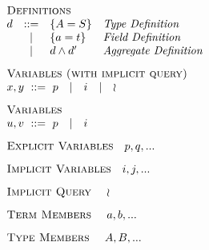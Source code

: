 \begin{minipage}[t]{.4\textwidth}\[\begin{array}{r c l l}
    \multicolumn{4}{l}{\textsc{Definitions}}                  \\
    d & ::= & \DEF{A}{S}      & \textit{Type Definition     } \\
      &  |  & \DEF{a}{t}      & \textit{Field Definition    } \\
      &  |  & \AGG{d}{d'}     & \textit{Aggregate Definition} \\[3mm]
    \multicolumn{4}{l}{\textsc{Variables (with implicit query)}} \\
    \multicolumn{4}{l}{x, y\ ::=\ p \quad | \quad i \quad | \quad \IMP} \\[3mm]
    \multicolumn{4}{l}{\textsc{Variables}} \\
    \multicolumn{4}{l}{u, v\ ::=\  p \quad | \quad i} \\[3mm]
    \multicolumn{4}{l}{\textsc{Explicit Variables} \quad p, q, ...} \\[3mm]
    \multicolumn{4}{l}{\textsc{Implicit Variables} \quad i, j, ...} \\[3mm]
    \multicolumn{4}{l}{\textsc{Implicit Query    } \quad \IMP     } \\[3mm]
    \multicolumn{4}{l}{\textsc{Term Members      } \quad a, b, ...} \\[3mm]
    \multicolumn{4}{l}{\textsc{Type Members      } \quad A, B, ...} \\[3mm]
\end{array}\]\end{minipage}
